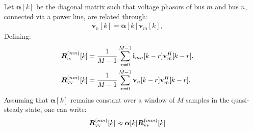 \documentclass[twocolumn]{IEEEtran}
\newcommand{\bs}{\boldsymbol}
\newcommand{\mb}{\mathbf}
\begin{document}
Let $\bs{\alpha}[k]$ be the diagonal matrix such that voltage phasors of bus $m$ and bus $n$, connected via a power line, are related through: 
\begin{align}
\mb{v}_n[k]= \bs{\alpha}[k]\mb{v}_m[k],
\end{align}
Defining:
 \begin{align}
 \bs R^{(mn)}_{\rm iv}[k]&=\frac{1}{M-1}\sum_{r=0}^{M-1} \mb{i}_{mn}[k-r]\mb{v}^H_{m}[k-r],\\
  \bs R^{(nm)}_{\rm vv}[k]&=\frac{1}{M-1}\sum_{r=0}^{M-1} \mb{v}_{n}[k-r]\mb{v}^H_{m}[k-r],
 \end{align}
Assuming that $\bs{\alpha}[k]$ remains constant over a window of $M$ samples in the quasi-steady state, one can write:
 \begin{align}
\bs R^{(nm)}_{\rm vv}[k]\approx \bs{\alpha}[k] \bs R^{(mm)}_{\rm vv}[k]
 \end{align}
\end{document}
